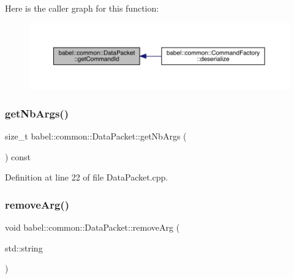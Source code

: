 Here is the caller graph for this function\+:\nopagebreak
\begin{figure}[H]
\begin{center}
\leavevmode
\includegraphics[width=350pt]{classbabel_1_1common_1_1_data_packet_a70997898a38b52a810dcaab6e390e13b_icgraph}
\end{center}
\end{figure}
\mbox{\label{classbabel_1_1common_1_1_data_packet_ac931a547932857c13bbb641464d43422}} 
\subsubsection{\texorpdfstring{get\+Nb\+Args()}{getNbArgs()}}
{\footnotesize\ttfamily size\+\_\+t babel\+::common\+::\+Data\+Packet\+::get\+Nb\+Args (\begin{DoxyParamCaption}{ }\end{DoxyParamCaption}) const}



Definition at line 22 of file Data\+Packet.\+cpp.

\mbox{\label{classbabel_1_1common_1_1_data_packet_a809bfdee8aa18d067790b9d2672d1ab7}} 
\subsubsection{\texorpdfstring{remove\+Arg()}{removeArg()}}
{\footnotesize\ttfamily void babel\+::common\+::\+Data\+Packet\+::remove\+Arg (\begin{DoxyParamCaption}\item[{std\+::string}]{ }\end{DoxyParamCaption})}



